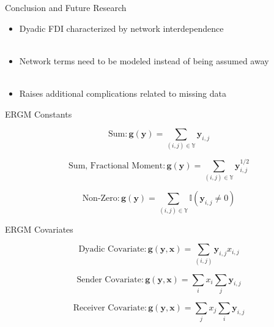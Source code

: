 \documentclass{beamer}
\begin{document}
\begin{frame}{Conclusion and Future Research}

\begin{itemize}
\item{Dyadic FDI characterized by network interdependence}
\\~\\
\item{Network terms need to be modeled instead of being assumed away} \\~\\
\item{Raises additional complications related to missing data}
\end{itemize}





\end{frame}





\begin{frame}{ERGM Constants}

$$\text{Sum}:\bm{g\left(y\right)} = \sum_{(i,j) {\in} \mathbb{Y}}\bm{y}_{i,j}$$

$$\text{Sum, Fractional Moment}:\bm{g\left(y\right)} = \sum_{(i,j) {\in} \mathbb{Y}}\bm{y}_{i,j}^{1/2}$$

$$\text{Non-Zero}:\bm{g\left(y\right)} = \sum_{(i,j) {\in} \mathbb{Y}} \mathbb{I}(\bm{y}_{i,j} \neq 0)$$

\end{frame}


\begin{frame}{ERGM Covariates}

$$ \text{Dyadic Covariate}: \bm{g\left(y,x\right)} = \sum_{(i,j)} \bm{y}_{i,j}x_{i,j}$$ 

$$ \text{Sender Covariate}: \bm{g\left(y,x\right)} = \sum_{i}x_i \sum_{j} \bm{y}_{i,j}$$

$$ \text{Receiver Covariate}: \bm{g\left(y,x\right)} = \sum_{j}x_j \sum_{i} \bm{y}_{i,j}$$
 

\end{frame}
\end{document}
